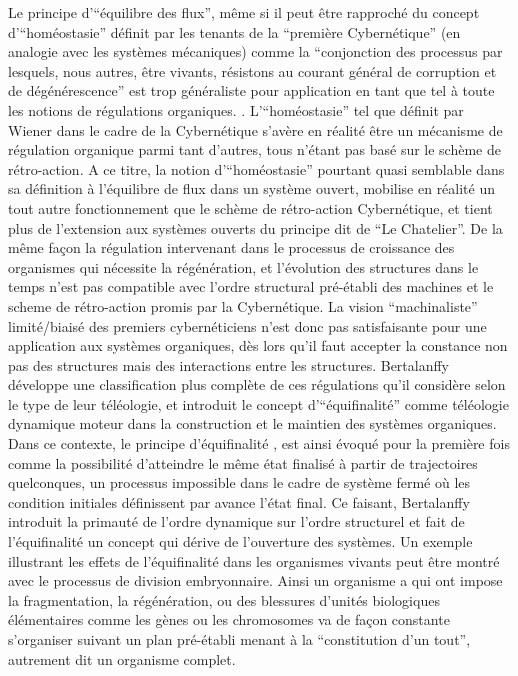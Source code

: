Le principe d'\enquote{équilibre des flux}, même si il peut être rapproché du concept d'\enquote{homéostasie} définit par les tenants de la \enquote{première Cybernétique} (en analogie avec les systèmes mécaniques) comme la \enquote{conjonction des processus par lesquels, nous autres, être vivants, résistons au courant général de corruption et de dégénérescence} est trop généraliste pour application en tant que tel à toute les notions de régulations organiques. \autocite[194]{Morin1977} \autocite{Wiener1950}. L'\enquote{homéostasie} tel que définit par Wiener dans le cadre de la Cybernétique s'avère en réalité être un mécanisme de régulation organique parmi tant d'autres, tous n'étant pas basé sur le schème de rétro-action. A ce titre, la notion d'\enquote{homéostasie} pourtant quasi semblable dans sa définition à l'équilibre de flux dans un système ouvert, mobilise en réalité un tout autre fonctionnement que le schème de rétro-action Cybernétique, et tient plus de l'extension aux systèmes ouverts du principe dit de \enquote{Le Chatelier}. De la même façon la régulation intervenant dans le processus de croissance des organismes qui nécessite la régénération, et l'évolution des structures dans le temps n'est pas compatible avec l'ordre structural pré-établi des machines et le scheme de rétro-action promis par la Cybernétique. La vision \enquote{machinaliste} limité/biaisé des premiers cybernéticiens n'est donc pas satisfaisante pour une application aux systèmes organiques, dès lors qu'il faut accepter la constance non pas des structures mais des interactions entre les structures. Bertalanffy développe une classification plus complète de ces régulations qu'il considère selon le type de leur téléologie, et introduit le concept d'\enquote{équifinalité} comme téléologie dynamique moteur dans la construction et le maintien des systèmes organiques. Dans ce contexte, le principe d'équifinalité \autocite[131]{Pouvreau2013}, est ainsi évoqué pour la première fois comme la possibilité d'atteindre le même état finalisé à partir de trajectoires quelconques, un processus impossible dans le cadre de système fermé où les condition initiales définissent par avance l'état final. Ce faisant, Bertalanffy introduit la primauté de l'ordre dynamique sur l'ordre structurel et fait de l'équifinalité un concept qui dérive de l'ouverture des systèmes. \autocite[489]{Pouvreau2013} \autocite[647]{Pouvreau2013} Un exemple illustrant les effets de l'équifinalité dans les organismes vivants peut être montré avec le processus de division embryonnaire. Ainsi un organisme a qui ont impose la fragmentation, la régénération, ou des blessures d'unités biologiques élémentaires comme les gènes ou les chromosomes va de façon constante s'organiser suivant un plan pré-établi menant à la \enquote{constitution d'un tout}, autrement dit un organisme complet.

